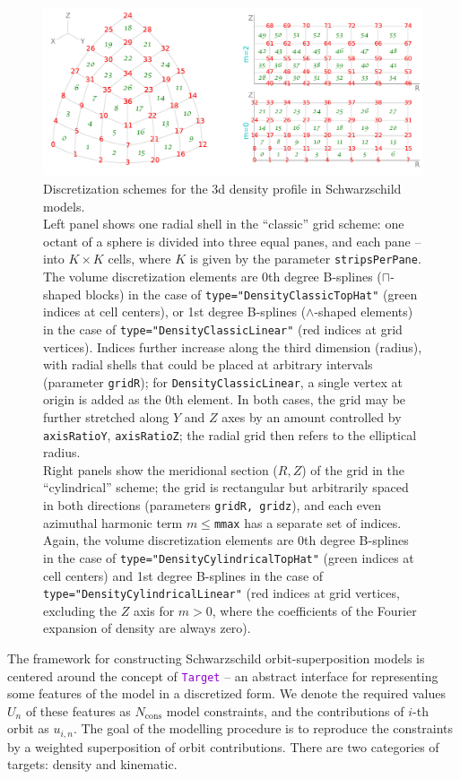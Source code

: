 \documentclass[12pt]{article}
\newcommand{\ttt}[1]{\textcolor{darkviolet}{\texttt{#1}}}
\newcommand{\ppp}[1]{\textcolor{darkolive} {\texttt{#1}}}
\begin{document}
\begin{figure}
\includegraphics[width=16cm]{DensityGrid.pdf}
\caption{Discretization schemes for the 3d density profile in Schwarzschild models.\protect\\
Left panel shows one radial shell in the ``classic'' grid scheme: one octant of a sphere is divided into three equal panes, and each pane -- into $K\times K$ cells, where $K$ is given by the parameter \ppp{stripsPerPane}. The volume discretization elements are 0th degree B-splines ($\sqcap$-shaped blocks) in the case of \ppp{type="DensityClassicTopHat"} (green indices at cell centers), or 1st degree B-splines ($\wedge$-shaped elements) in the case of \ppp{type="DensityClassicLinear"} (red indices at grid vertices). Indices further increase along the third dimension (radius), with radial shells that could be placed at arbitrary intervals (parameter \ppp{gridR}); for \ppp{DensityClassicLinear}, a single vertex at origin is added as the 0th element. In both cases, the grid may be further stretched along $Y$ and $Z$ axes by an amount controlled by \ppp{axisRatioY}, \ppp{axisRatioZ}; the radial grid then refers to the elliptical radius.\protect\\
Right panels show the meridional section ($R,Z$) of the grid in the ``cylindrical'' scheme; the grid is rectangular but arbitrarily spaced in both directions (parameters \ppp{gridR, gridz}), and each even azimuthal harmonic term $m \le {}$\ppp{mmax} has a separate set of indices. Again, the volume discretization elements are 0th degree B-splines in the case of \ppp{type="DensityCylindricalTopHat"} (green indices at cell centers) and 1st degree B-splines in the case of \ppp{type="DensityCylindricalLinear"} (red indices at grid vertices, excluding the $Z$ axis for $m>0$, where the coefficients of the Fourier expansion of density are always zero).
}  \label{fig:DensityGrid}
\end{figure}

The framework for constructing Schwarzschild orbit-superposition models is centered around the concept of \ttt{Target} -- an abstract interface for representing some features of the model in a discretized form. We denote the required values $U_n$ of these features as $N_\mathrm{cons}$ model constraints, and the contributions of $i$-th orbit as $u_{i,n}$. The goal of the modelling procedure is to reproduce the constraints by a weighted superposition of orbit contributions.
There are two categories of targets: density and kinematic.
\end{document}
